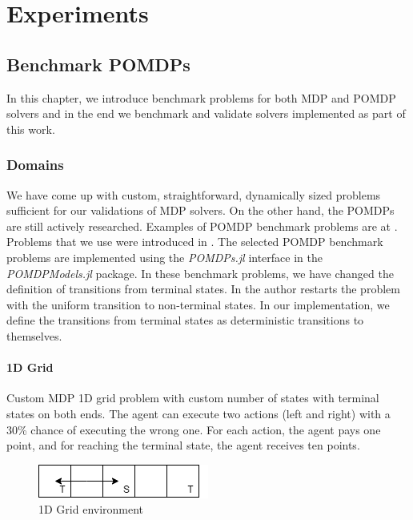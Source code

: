  \part{Experiments}

\chapter{Benchmark POMDPs}

In this chapter, we introduce benchmark problems for both MDP and POMDP solvers and in the end we benchmark and validate solvers implemented as part of this work.

\section{Domains}

We have come up with custom, straightforward, dynamically sized problems sufficient for our validations of MDP solvers. On the other hand, the POMDPs are still actively researched. Examples of POMDP benchmark problems are at \cite{cassandra_1999}. Problems that we use were introduced in \cite{Littman}. The selected POMDP benchmark problems are implemented using the \textit{POMDPs.jl} interface in the \textit{POMDPModels.jl} package. In these benchmark problems, we have changed the definition of transitions from terminal states. In \cite{Littman} the author restarts the problem with the uniform transition to non-terminal states. In our implementation, we define the transitions from terminal states as deterministic transitions to themselves. 


\subsection{1D Grid}
Custom MDP 1D grid problem with custom number of states with terminal states on both ends. The agent can execute two actions (left and right) with a 30\% chance of executing the wrong one. For each action, the agent pays one point, and for reaching the terminal state, the agent receives ten points. 

\begin{figure}[ht]
\caption{1D Grid environment}
\centering
\includegraphics[scale=0.5]{pictures/1D_grid.png}
\end{figure}

